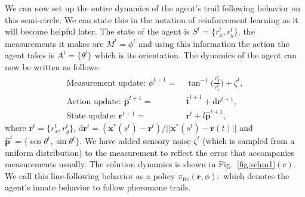 \documentclass[12pt]{article}
\def\d{\text{d}}
\def\r{\mathbf{r}}
\def\xst{\mathbf{x}^*}
\def\th{\hat{\mathbf{t}}}
\def\ph{\hat{\mathbf{p}}}
\def\ite{\text{ite}}
\begin{document}
We can now set up the entire dynamics of the agent's trail following behavior on this semi-circle. We can state this
in the notation of reinforcement learning as it will become helpful later. The state of the agent
is $S^t = \{ r_x^t, r_y^t \}$, the measurements it makes are $M^t = \phi^t$ and using this information
the action the agent takes is $A^t = \{ \theta^t \}$ which is its orientation. The dynamics of
the agent can now be written as follows:
\begin{align}
    \text{Measurement update: } \phi^{t+1} = & \ \tan^{-1} \bigg( \frac{r_y^t}{r_x^t} \bigg) + \zeta^t, \\
    \text{Action update: }\ph^{t+1} =& \ \th^{t+1} + \d\r^{t+1}, \\
    \text{State update: } \r^{t+1} =& \ \r^t + l \ph^{t+1},
\end{align}
where $\r^t = \{ r_x^t, r_y^t \}$, $\d\r^t = (\xst(s^t)-\r^t)/||\xst(s^t)-\r(t)||$ and $\ph^t = \{ \cos \theta^t, \sin \theta^t \}$.
We have added sensory noise $\zeta^t$ (which is sampled from a uniform distribution) to the measurement
to reflect the error that accompanies measurements usually. The solution dynamics is shown
in Fig.~\ref{fig:schm1}$(c)$. We call this line-following behavior as a policy
$\pi_\ite(\r, \phi): $
which denotes the agent's innate behavior to follow pheromone trails.
\end{document}
